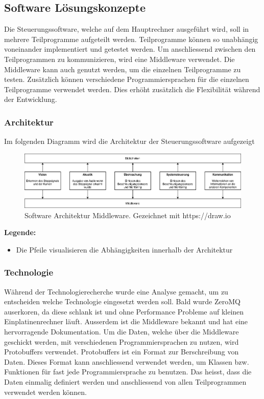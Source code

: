 \documentclass[../../main.tex]{subfiles}
\begin{document}
\subsection{Software Lösungskonzepte}
Die Steuerungssoftware, welche auf dem Hauptrechner ausgeführt wird, soll in mehrere Teilprogramme aufgeteilt werden.
Teilprogramme können so unabhängig voneinander implementiert und getestet werden.
Um anschliessend zwischen den Teilprogrammen zu kommunizieren, wird eine Middleware verwendet. Die Middleware kann auch genutzt werden,
um die einzelnen Teilprogramme zu testen. Zusätzlich können verschiedene Programmiersprachen für die einzelnen Teilprogramme verwendet werden.
Dies erhöht zusätzlich die Flexibilität während der Entwicklung.

\subsubsection{Architektur}
Im folgenden Diagramm wird die Architektur der Steuerungssoftware aufgezeigt
\begin{figure}[H] %
    \centering
    \includegraphics[width=1.0\textwidth]{drawings/ArchitekturDiagramm/SW_Architektur_Middleware.png}
    \caption {Software Architektur Middleware. Gezeichnet mit https://draw.io}
\end{figure}

\textbf{Legende:}
\begin{itemize}
    \item Die Pfeile visualisieren die Abhängigkeiten innerhalb der Architektur
\end{itemize}

\subsubsection{Technologie}
Während der Technologierecherche wurde eine Analyse gemacht, um zu entscheiden welche Technologie eingesetzt werden soll. Bald wurde ZeroMQ
auserkoren, da diese schlank ist und ohne Performance Probleme auf kleinen Einplatinenrechner läuft. Ausserdem ist die Middleware bekannt
und hat eine hervorragende Dokumentation. Um die Daten, welche über die Middleware geschickt werden, mit verschiedenen Programmiersprachen zu
nutzen, wird Protobuffers verwendet. Protobuffers ist ein Format zur Berschreibung von Daten. Dieses Format kann anschliessend verwendet werden, um
Klassen bzw. Funktionen für fast jede Programmiersprache zu benutzen. Das heisst, dass die Daten einmalig definiert werden und anschliessend von
allen Teilprogrammen verwendet werden können.
\end{document}
